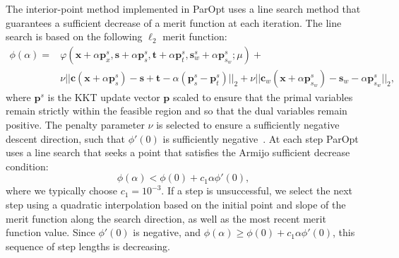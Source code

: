 \documentclass[12pt]{article}
\newcommand{\mb}{\mathbf}
\begin{document}
The interior-point method implemented in ParOpt uses a line search method that guarantees a sufficient decrease of a merit function at each iteration.
The line search is based on the following $\ell_{2}$ merit function:
%
\begin{equation}
  \label{eqn:merit-function}
  \begin{aligned}
    \phi(\alpha) = & \varphi(\mb{x} + \alpha\mb{p}_{x}^{s}, \mb{s} + \alpha\mb{p}_{s}^{s}, \mb{t} + \alpha\mb{p}_{t}^{s}, \mb{s}_{w}^{s} + \alpha\mb{p}^{s}_{s_{w}}; \mu) + \\
    & \nu ||\mb{c}(\mb{x} + \alpha\mb{p}_{s}^{s}) - \mb{s} + \mb{t}  - \alpha (\mb{p}_{s}^{s} - \mb{p}_{t}^{s})||_{2} +
    \nu ||\mb{c}_{w}(\mb{x} + \alpha\mb{p}^{s}_{s_{w}}) - \mb{s}_{w} - \alpha\mb{p}_{s_{w}}^{s}||_{2},
  \end{aligned}
\end{equation}
%
where $\mb{p}^{s}$ is the KKT update vector $\mb{p}$ scaled to ensure that the primal variables remain strictly within the feasible region and so that the dual variables remain positive.
The penalty parameter $\nu$ is selected to ensure a sufficiently negative descent direction, such that $\phi'(0)$ is sufficiently negative~\citep{Nocedal.Wright}.
At each step ParOpt uses a line search that seeks a point that satisfies the Armijo sufficient decrease condition:
%
\begin{equation*}
  \phi(\alpha) < \phi(0) + c_{1} \alpha \phi'(0),
\end{equation*}
where we typically choose $c_{1} = 10^{-3}$. If a step is unsuccessful, we select the next step using a quadratic interpolation based on the initial point and slope of the merit function along the search direction, as well as the most recent merit function value.
Since $\phi'(0)$ is negative, and $\phi(\alpha) \ge \phi(0) + c_{1} \alpha \phi'(0)$, this sequence of step lengths is decreasing.
\end{document}
